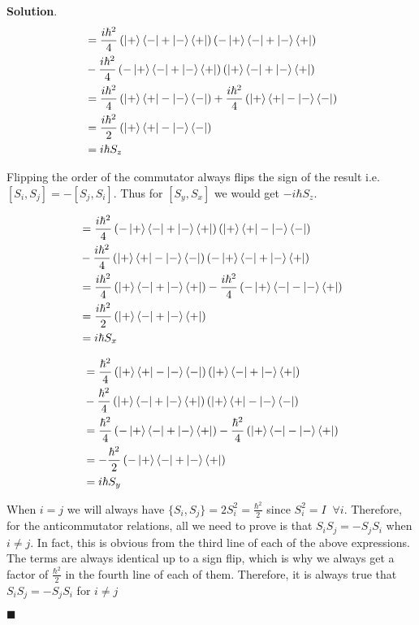 \documentclass[12pt]{article}
\theoremstyle{definition}
\newenvironment{s}{%
        \begin{trivlist} \item \textbf{Solution}. }{%
            \hspace*{\fill} $\blacksquare$\end{trivlist}}%
\begin{document}
{\begin{s}
\begin{align*}
[S_{x},S_{y}] &= \frac{i\hbar^{2}}{4}\left(\ket{+}\bra{-} + \ket{-}\bra{+}\right)\left(-\ket{+}\bra{-} + \ket{-}\bra{+}\right)\\
&- \frac{i\hbar^{2}}{4}\left(-\ket{+}\bra{-} + \ket{-}\bra{+}\right)\left(\ket{+}\bra{-} + \ket{-}\bra{+}\right)\\
&= \frac{i\hbar^{2}}{4}\left(\ket{+}\bra{+} - \ket{-}\bra{-}\right) + \frac{i\hbar^{2}}{4}\left(\ket{+}\bra{+} - \ket{-}\bra{-}\right)\\
&= \frac{i\hbar^{2}}{2}\left(\ket{+}\bra{+} - \ket{-}\bra{-}\right)\\
&= i\hbar S_{z}
\end{align*}

Flipping the order of the commutator always flips the sign of the result i.e. $[S_{i},S_{j}] = -[S_{j},S_{i}]$. Thus for $[S_y,S_x]$ we would get $-i\hbar S_{z}$.

\begin{align*}
[S_{y},S_{z}] &= \frac{i\hbar^{2}}{4}\left(-\ket{+}\bra{-} + \ket{-}\bra{+}\right)\left(\ket{+}\bra{+} - \ket{-}\bra{-}\right)\\
&- \frac{i\hbar^{2}}{4}\left(\ket{+}\bra{+} - \ket{-}\bra{-}\right)\left(-\ket{+}\bra{-} + \ket{-}\bra{+}\right)\\
&= \frac{i\hbar^{2}}{4}\left(\ket{+}\bra{-} + \ket{-}\bra{+}\right) -  \frac{i\hbar^{2}}{4}\left(-\ket{+}\bra{-} - \ket{-}\bra{+}\right)\\
&=  \frac{i\hbar^{2}}{2}\left(\ket{+}\bra{-} + \ket{-}\bra{+}\right)\\
&= i\hbar S_{x}
\end{align*}

\begin{align*}
[S_{z},S_{x}] &= \frac{\hbar^{2}}{4}\left(\ket{+}\bra{+} - \ket{-}\bra{-}\right)\left(\ket{+}\bra{-} + \ket{-}\bra{+}\right)\\
&- \frac{\hbar^{2}}{4}\left(\ket{+}\bra{-} + \ket{-}\bra{+}\right)\left(\ket{+}\bra{+} - \ket{-}\bra{-}\right)\\
&= \frac{\hbar^{2}}{4}\left(-\ket{+}\bra{-} + \ket{-}\bra{+}\right) -\frac{\hbar^{2}}{4}\left(\ket{+}\bra{-} - \ket{-}\bra{+}\right)\\
&= -\frac{\hbar^{2}}{2}\left(-\ket{+}\bra{-} + \ket{-}\bra{+}\right)\\
&= i\hbar S_{y}
\end{align*}

When $i=j$ we will always have $\{S_{i},S_{j}\} = 2S_{i}^{2} = \frac{\hbar^{2}}{2}$ since $S_{i}^{2} = I \;\;\forall i$. Therefore, for the anticommutator relations, all we need to prove is that $S_{i}S_{j} = -S_{j}S_{i}$ when $i\neq j$. In fact, this is obvious from the third line of each of the above expressions. The terms are always identical up to a sign flip, which is why we always get a factor of $\frac{\hbar^{2}}{2}$ in the fourth line of each of them. Therefore, it is always true that $S_{i}S_{j} = -S_{j}S_{i}$ for $i\neq j$


\end{s}}
\end{document}
